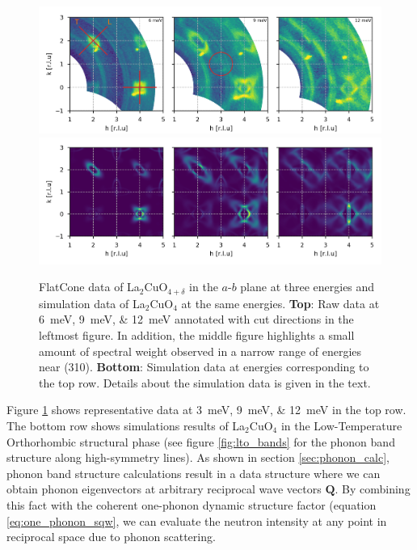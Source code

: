 \begin{figure}
    \includegraphics[width=\textwidth]{fig/lowen/flatcone_colorplots.png}
    \includegraphics[width=\textwidth]{fig/lowen/simulation_colorplots.png}
    \caption[Flatcone raw inelastic]{FlatCone data of La$_2$CuO$_{4+\delta}$ in the $a$-$b$ plane at three energies and simulation data of La$_2$CuO$_{4}$ at the same energies. \textbf{Top}: Raw data at \SIlist{6;9;12}{\milli\eV} annotated with cut directions in the leftmost figure. In addition, the middle figure highlights a small amount of spectral weight observed in a narrow range of energies near (310). \textbf{Bottom}: Simulation data at energies corresponding to the top row. Details about the simulation data is given in the text.}
    \label{fig:flatcone_raw_inelastic}
\end{figure}

Figure \ref{fig:flatcone_raw_inelastic} shows representative data at \SIlist{3;9;12}{\milli\eV} in the top row. The bottom row shows simulations results of La$_2$CuO$_4$ in the Low-Temperature Orthorhombic structural phase (see figure \ref{fig:lto_bands} for the phonon band structure along high-symmetry lines). As shown in section \ref{sec:phonon_calc}, phonon band structure calculations result in a data structure where we can obtain phonon eigenvectors at arbitrary reciprocal wave vectors $\bm{Q}$. By combining this fact with the coherent one-phonon dynamic structure factor (equation \eqref{eq:one_phonon_sqw}, we can evaluate the neutron intensity at any point in reciprocal space due to phonon scattering.

